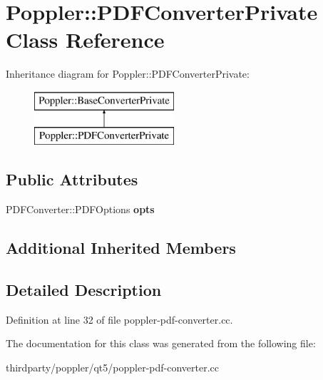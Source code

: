 \hypertarget{class_poppler_1_1_p_d_f_converter_private}{}\section{Poppler\+:\+:P\+D\+F\+Converter\+Private Class Reference}
\label{class_poppler_1_1_p_d_f_converter_private}
Inheritance diagram for Poppler\+:\+:P\+D\+F\+Converter\+Private\+:\begin{figure}[H]
\begin{center}
\leavevmode
\includegraphics[height=2.000000cm]{class_poppler_1_1_p_d_f_converter_private}
\end{center}
\end{figure}
\subsection*{Public Attributes}
\begin{DoxyCompactItemize}
\item 
\mbox{\label{class_poppler_1_1_p_d_f_converter_private_a9e39da300454eb78cda43d0ce40e835d}} 
P\+D\+F\+Converter\+::\+P\+D\+F\+Options {\bfseries opts}
\end{DoxyCompactItemize}
\subsection*{Additional Inherited Members}


\subsection{Detailed Description}


Definition at line 32 of file poppler-\/pdf-\/converter.\+cc.



The documentation for this class was generated from the following file\+:\begin{DoxyCompactItemize}
\item 
thirdparty/poppler/qt5/poppler-\/pdf-\/converter.\+cc\end{DoxyCompactItemize}
